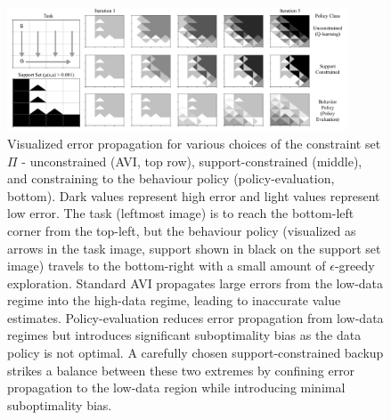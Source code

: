 \begin{figure}
    \centering
    \includegraphics[width=0.9\textwidth]{images/gridworld}
    \caption{Visualized error propagation for various choices of the constraint set $\Pi$
    - unconstrained (AVI,
    top row), support-constrained (middle),
    and constraining to the behaviour policy (policy-evaluation, bottom). Dark values represent high error and light values represent low error. The task (leftmost image) is to reach the bottom-left corner from the top-left, but the behaviour policy (visualized as arrows in the task image, support shown in black on the support set image) travels to the bottom-right with a small amount of $\epsilon$-greedy exploration. Standard AVI propagates large errors from the low-data regime into the high-data regime, leading to inaccurate value estimates. Policy-evaluation reduces error propagation from low-data regimes but introduces significant suboptimality bias as the data policy is not optimal. A carefully chosen support-constrained backup strikes a balance between these two extremes by confining error propagation to the low-data region while introducing minimal suboptimality bias.}
    \label{fig:gridworld} 
\end{figure}


